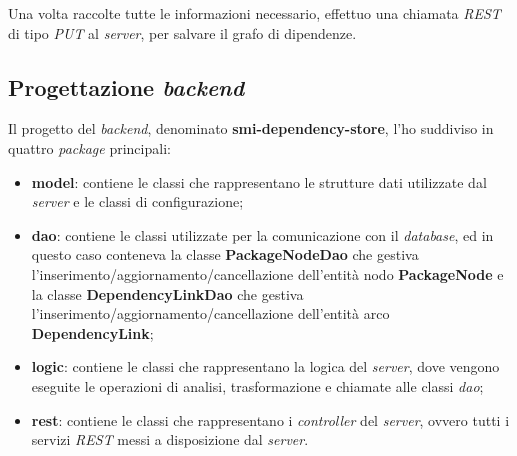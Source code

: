 Una volta raccolte tutte le informazioni necessario, effettuo una chiamata \textit{REST} di tipo \textit{PUT} al \textit{server},
per salvare il grafo di dipendenze.\\
\subsection*{Progettazione \textit{backend}}
Il progetto del \textit{backend}, denominato \textbf{smi-dependency-store}, l'ho suddiviso in quattro \textit{package} principali:
\begin{itemize}
  \item \textbf{model}: contiene le classi che rappresentano le strutture dati utilizzate dal \textit{server} e 
  le classi di configurazione;
  \item \textbf{dao}: contiene le classi utilizzate per la comunicazione con il \textit{database}, ed in questo caso
  conteneva la classe \textbf{PackageNodeDao} che gestiva l'inserimento/aggiornamento/cancellazione dell'entità nodo \textbf{PackageNode}
  e la classe \textbf{DependencyLinkDao} che gestiva l'inserimento/aggiornamento/cancellazione dell'entità arco \textbf{DependencyLink};
  \item \textbf{logic}: contiene le classi che rappresentano la logica del \textit{server}, dove vengono eseguite le operazioni di analisi, 
  trasformazione e chiamate alle classi \textit{dao};
  \item \textbf{rest}: contiene le classi che rappresentano i \textit{controller} del \textit{server}, 
  ovvero tutti i servizi \textit{REST} messi a disposizione dal \textit{server}.
\end{itemize}


